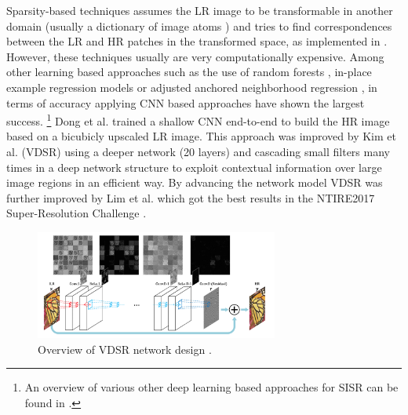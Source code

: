 Sparsity-based techniques assumes the LR image to be transformable in another
domain (usually a dictionary of image atoms \cite{SARPFTTAISAIP}) and tries to
find correspondences between the LR and HR patches in the transformed space, as
implemented in \cite{IDASRBASDSAAR}. However, these techniques usually are
very computationally expensive. Among other learning based approaches such as
the use of random forests \cite{FAAIUWSRF}, in-place example regression models
\cite{FISRBOIPER} or adjusted anchored neighborhood regression \cite{AANRFFSR},
in terms of accuracy applying CNN based approaches have shown the largest success.
\footnote{An overview of various other deep learning based approaches for SISR
can be found in \cite{DLFSISRABR}.}
Dong et al. \cite{LADCNFISR} trained a shallow CNN end-to-end to build the HR
image based on a bicubicly upscaled LR image. This approach was improved by Kim
et al. \cite{AISRUVDCN} (VDSR) using a deeper network (20 layers) and cascading
small filters many times in a deep network structure to exploit contextual
information over large image regions in an efficient way. By advancing the
network model VDSR was further improved by Lim et al. \cite{EDRNFSISR} which
got the best results in the NTIRE2017 Super-Resolution Challenge \cite{NTIRE2017}.

\begin{figure}[!htbp]
	\centering
	\includegraphics[width=8cm]{figures/vdsr}
	\caption{Overview of VDSR network design \cite{AISRUVDCN}.}
  \label{fig:vdsr}
\end{figure}

